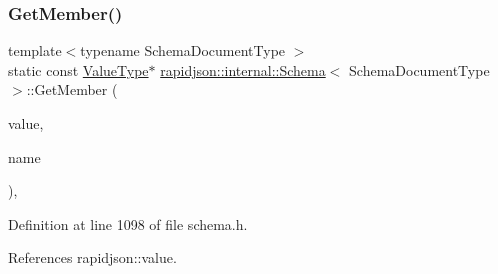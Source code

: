 \subsubsection{\texorpdfstring{GetMember()}{GetMember()}}
{\footnotesize\ttfamily template$<$typename Schema\+Document\+Type $>$ \\
static const \mbox{\hyperlink{classrapidjson_1_1internal_1_1_schema_a3979a9083c598195927c08c6e3ba91d1}{Value\+Type}}$\ast$ \mbox{\hyperlink{classrapidjson_1_1internal_1_1_schema}{rapidjson\+::internal\+::\+Schema}}$<$ Schema\+Document\+Type $>$\+::Get\+Member (\begin{DoxyParamCaption}\item[{const \mbox{\hyperlink{classrapidjson_1_1internal_1_1_schema_a3979a9083c598195927c08c6e3ba91d1}{Value\+Type}} \&}]{value,  }\item[{const \mbox{\hyperlink{classrapidjson_1_1internal_1_1_schema_a3979a9083c598195927c08c6e3ba91d1}{Value\+Type}} \&}]{name }\end{DoxyParamCaption})\hspace{0.3cm}{\ttfamily [static]}, {\ttfamily [private]}}



Definition at line 1098 of file schema.\+h.


\begin{DoxyCode}{0}

\end{DoxyCode}


References rapidjson\+::value.

\mbox{\label{classrapidjson_1_1internal_1_1_schema_a7edda75b81d1b8d82069308bd1511f1d}} 
